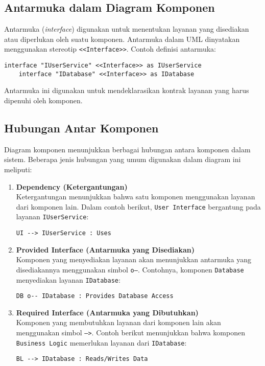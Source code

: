 \subsection{Antarmuka dalam Diagram Komponen}
Antarmuka (\textit{interface}) digunakan untuk menentukan layanan yang disediakan atau diperlukan oleh suatu komponen. Antarmuka dalam UML dinyatakan menggunakan stereotip \texttt{<<Interface>>}. Contoh definisi antarmuka:
\begin{lstlisting}[language=puml]
	interface "IUserService" <<Interface>> as IUserService
	interface "IDatabase" <<Interface>> as IDatabase
\end{lstlisting}
Antarmuka ini digunakan untuk mendeklarasikan kontrak layanan yang harus dipenuhi oleh komponen.

\subsection{Hubungan Antar Komponen}
Diagram komponen menunjukkan berbagai hubungan antara komponen dalam sistem. Beberapa jenis hubungan yang umum digunakan dalam diagram ini meliputi:

\begin{enumerate}
	\item \textbf{Dependency (Ketergantungan)} \\
	Ketergantungan menunjukkan bahwa satu komponen menggunakan layanan dari komponen lain. Dalam contoh berikut, \texttt{User Interface} bergantung pada layanan \texttt{IUserService}:
	\begin{lstlisting}[language=puml]
		UI --> IUserService : Uses
	\end{lstlisting}
	
	\item \textbf{Provided Interface (Antarmuka yang Disediakan)} \\
	Komponen yang menyediakan layanan akan menunjukkan antarmuka yang disediakannya menggunakan simbol \texttt{o--}. Contohnya, komponen \texttt{Database} menyediakan layanan \texttt{IDatabase}:
	\begin{lstlisting}[language=puml]
		DB o-- IDatabase : Provides Database Access
	\end{lstlisting}
	
	\item \textbf{Required Interface (Antarmuka yang Dibutuhkan)} \\
	Komponen yang membutuhkan layanan dari komponen lain akan menggunakan simbol \texttt{-->}. Contoh berikut menunjukkan bahwa komponen \texttt{Business Logic} memerlukan layanan dari \texttt{IDatabase}:
	\begin{lstlisting}[language=puml]
		BL --> IDatabase : Reads/Writes Data
	\end{lstlisting}
\end{enumerate}

